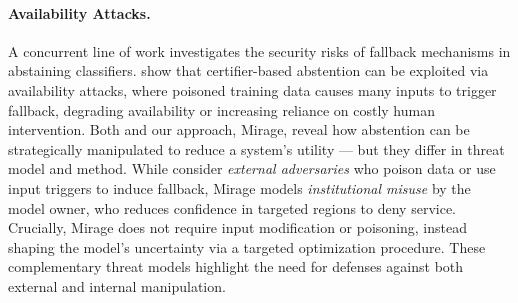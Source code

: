 

\paragraph{Availability Attacks.} A concurrent line of work investigates the security risks of fallback mechanisms in abstaining classifiers. \citet{lorenz2023certifiers} show that certifier-based abstention can be exploited via availability attacks, where poisoned training data causes many inputs to trigger fallback, degrading availability or increasing reliance on costly human intervention. Both \citet{lorenz2023certifiers} and our approach, Mirage, reveal how abstention can be strategically manipulated to reduce a system’s utility --- but they differ in threat model and method. While \citet{lorenz2023certifiers} consider \emph{external adversaries} who poison data or use input triggers to induce fallback, Mirage models \emph{institutional misuse} by the model owner, who reduces confidence in targeted regions to deny service. Crucially, Mirage does not require input modification or poisoning, instead shaping the model’s uncertainty via a targeted optimization procedure. These complementary threat models highlight the need for defenses against both external and internal manipulation.

